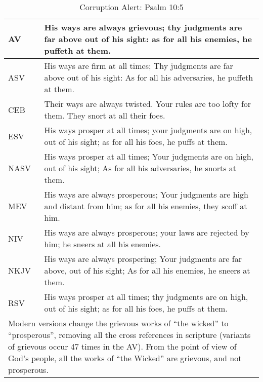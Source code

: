 
\begin{center}

\begin{table}[ht]
\centering
\begin{tabular}{|p{.5in}|p{3.5in}|}
    \hline

\textcolor[rgb]{0.00,0.00,1.00}{AV} & \textcolor[rgb]{0.00,0.00,1.00}{His ways are always grievous; thy judgments are far above out of his sight: as for all his enemies, he puffeth at them.} \\ \hline
%
ASV &  His ways are firm at all times; Thy judgments are far above out of his sight: As for all his adversaries, he puffeth at them. \\ \hline
%
CEB &  Their ways are always twisted.  Your rules are too lofty for them.   They snort at all their foes. \\ \hline
%
ESV & His ways prosper at all times;  your judgments are on high, out of his sight;   as for all his foes, he puffs at them. \\ \hline
%
NASV &  His ways prosper at all times; Your judgments are on high, out of his sight;  As for all his adversaries, he snorts at them.\\ \hline
%
MEV & His ways are always prosperous; Your judgments are high and distant from him;   as for all his enemies, they scoff at him. \\ \hline
%
NIV & His ways are always prosperous;   your laws are rejected by him;    he sneers at all his enemies. \\ \hline
%
NKJV &  His ways are always prospering; Your judgments are far above, out of his sight; As for all his enemies, he sneers at them.\\ \hline
%
RSV & His ways prosper at all times;   thy judgments are on high, out of his sight;  as for all his foes, he puffs at them.\\ \hline

\multicolumn{2}{p{4.3in}}{{Modern versions change the grievous works of ``the wicked'' to ``prosperous'', removing all the cross references in scripture (variants of grievous occur 47 times in the AV).  From the point of view of God's people, all the works of ``the Wicked'' are grievous, and not prosperous.}} \\ %
\end{tabular}

\caption[Corruption Alert: Psalm 10:5]{Corruption Alert: Psalm 10:5} \label{table:Corruption Psalm 10:5}

\end{table}

\end{center}



